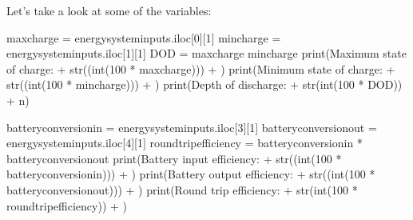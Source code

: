 \documentclass[letterpaper,10pt,english]{sphinxmanual}
\begin{document}
\sphinxAtStartPar
Let’s take a look at some of the variables:

\begin{sphinxVerbatim}[commandchars=\\\{\}]
max\PYGZus{}charge = energy\PYGZus{}system\PYGZus{}inputs.iloc[0][1]
min\PYGZus{}charge = energy\PYGZus{}system\PYGZus{}inputs.iloc[1][1]
DOD = max\PYGZus{}charge \PYGZhy{} min\PYGZus{}charge
print(\PYGZsq{}Maximum state of charge: \PYGZsq{} + str((int(100 * max\PYGZus{}charge))) + \PYGZsq{}\PYGZpc{}\PYGZsq{})
print(\PYGZsq{}Minimum state of charge: \PYGZsq{} + str((int(100 * min\PYGZus{}charge))) + \PYGZsq{}\PYGZpc{}\PYGZsq{})
print(\PYGZsq{}Depth of discharge: \PYGZsq{} + str(int(100 * DOD)) + \PYGZsq{}\PYGZpc{}\PYGZbs{}n\PYGZsq{})

battery\PYGZus{}conversion\PYGZus{}in = energy\PYGZus{}system\PYGZus{}inputs.iloc[3][1]
battery\PYGZus{}conversion\PYGZus{}out = energy\PYGZus{}system\PYGZus{}inputs.iloc[4][1]
round\PYGZus{}trip\PYGZus{}efficiency = battery\PYGZus{}conversion\PYGZus{}in * battery\PYGZus{}conversion\PYGZus{}out
print(\PYGZsq{}Battery input efficiency: \PYGZsq{} + str((int(100 * battery\PYGZus{}conversion\PYGZus{}in))) + \PYGZsq{}\PYGZpc{}\PYGZsq{})
print(\PYGZsq{}Battery output efficiency: \PYGZsq{} + str((int(100 * battery\PYGZus{}conversion\PYGZus{}out))) + \PYGZsq{}\PYGZpc{}\PYGZsq{})
print(\PYGZsq{}Round trip efficiency: \PYGZsq{} + str(int(100 * round\PYGZus{}trip\PYGZus{}efficiency)) + \PYGZsq{}\PYGZpc{}\PYGZsq{})
\end{sphinxVerbatim}

\begin{sphinxVerbatim}[commandchars=\\\{\}]
    
    
   

   
   
   
\end{sphinxVerbatim}
\end{document}

